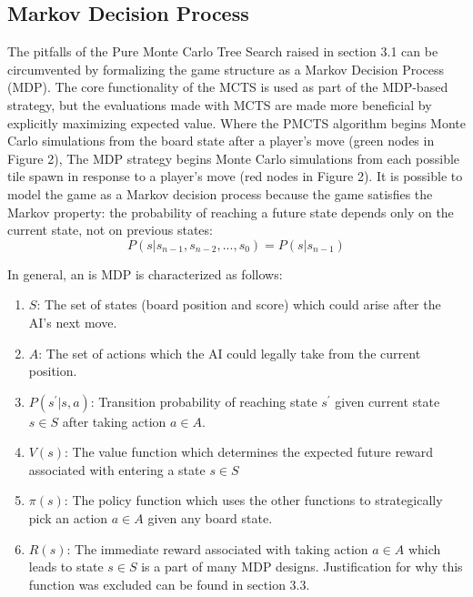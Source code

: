 \documentclass{article}
\begin{document}
\subsection{Markov Decision Process}
The pitfalls of the Pure Monte Carlo Tree Search raised in section 3.1 can be circumvented by formalizing the game structure as a Markov Decision Process (MDP).  The core functionality of the MCTS is used as part of the MDP-based strategy, but the evaluations made with MCTS are made more beneficial by explicitly maximizing expected value.  Where the PMCTS algorithm begins Monte Carlo simulations from the board state after a player's move (green nodes in Figure 2), The MDP strategy begins Monte Carlo simulations from each possible tile spawn in response to a player's move (red nodes in Figure 2).  It is possible to model the game as a Markov decision process because the game satisfies the Markov property: the probability of reaching a future state depends only on the current state, not on previous states: 
$$P(s|s_{n-1}, s_{n-2},...,s_{0}) = P(s|s_{n-1}) $$

\noindent In general, an is MDP is characterized as follows:
\begin{enumerate}
	\item $S$: The set of states (board position and score) which could arise after the AI's next move.
	\item $A$: The set of actions which the AI could legally take from the current position.
	\item $P(s^\prime | s, a)$: Transition probability of reaching state $s^\prime$ given current state $s \in S$ after taking action $a \in A$.
	\item $V(s)$: The value function which determines the expected future reward associated with entering a state $s \in S$
	\item $\pi(s)$: The policy function which uses the other functions to strategically pick an action $a \in A$ given any board state.
	\item $R(s)$: The immediate reward associated with taking action $a \in A$ which leads to state $s \in S$ is a part of many MDP designs.  Justification for why this function was excluded can be found in section 3.3.
\end{enumerate}
\end{document}

